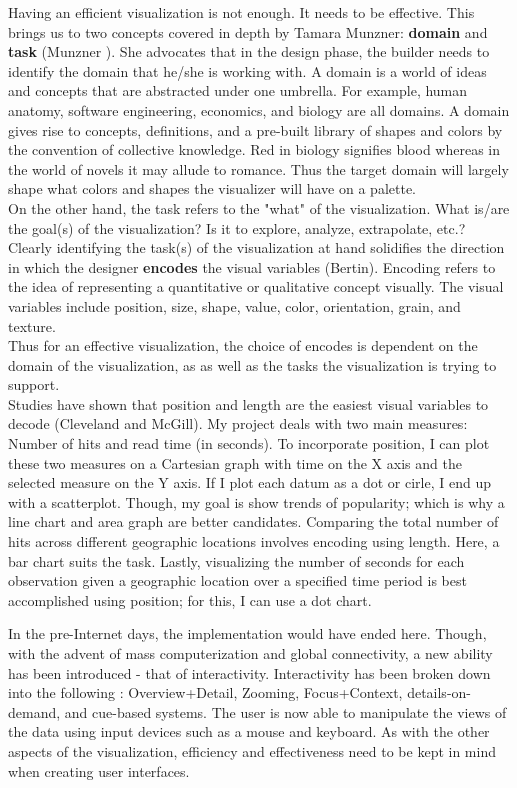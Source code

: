 \documentclass[12pt]{article}
\begin{document}
Having an efficient visualization is not enough. It needs to be effective. This brings us to two concepts covered in depth by Tamara Munzner: \textbf{domain} and \textbf{task} (Munzner \cite{munzner}). She advocates that in the design phase, the builder needs to identify the domain that he/she is working with. A domain is a world of ideas and concepts that are abstracted under one umbrella. For example, human anatomy, software engineering, economics, and biology are all domains. A domain gives rise to concepts, definitions, and a pre-built library of shapes and colors by the convention of collective knowledge. Red in biology signifies blood whereas in the world of novels it may allude to romance. Thus the target domain will largely shape what colors and shapes the visualizer will have on a palette. \\
On the other hand, the task refers to the "what" of the visualization. What is/are the goal(s) of the visualization? Is it to explore, analyze, extrapolate, etc.? Clearly identifying the task(s) of the visualization at hand solidifies the direction in which the designer \textbf{encodes} the visual variables (Bertin). Encoding refers to the idea of representing a quantitative or qualitative concept visually. The visual variables include position, size, shape, value, color, orientation, grain, and texture. \\
Thus for an effective visualization, the choice of encodes is dependent on the domain of the visualization, as as well as the tasks the visualization is trying to support. \\
Studies have shown that position and length are the easiest visual variables to decode (Cleveland and McGill). My project deals with two main measures: Number of hits and read time (in seconds). To incorporate position, I can plot these two measures on a Cartesian graph with time on the X axis and the selected measure on the Y axis. If I plot each datum as a dot or cirle, I end up with a scatterplot. Though, my goal is show trends of popularity; which is why a line chart and area graph are better candidates. Comparing the total number of hits across different geographic locations involves encoding using length. Here, a bar chart suits the task. Lastly, visualizing the number of seconds for each observation given a geographic location over a specified time period is best accomplished using position; for this, I can use a dot chart.   

In the pre-Internet days, the implementation would have ended here. Though, with the advent of mass computerization and global connectivity, a new ability has been introduced - that of interactivity. Interactivity has been broken down into the following \cite{cockburn}: Overview+Detail, Zooming, Focus+Context, details-on-demand, and cue-based systems. The user is now able to manipulate the views of the data using input devices such as a mouse and keyboard. As with the other aspects of the visualization, efficiency and effectiveness need to be kept in mind when creating user interfaces.
\end{document}
